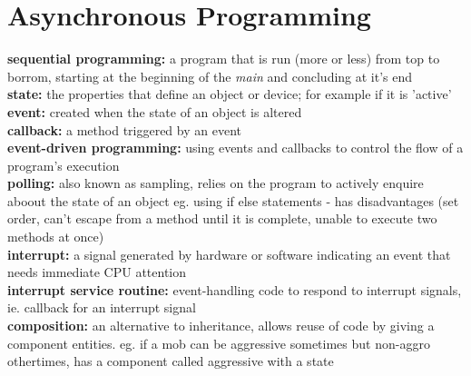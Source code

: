 \documentclass[a4paper,10pt]{article}
\begin{document}
\section {Asynchronous Programming}
\textcolor{RoyalPurple}{\textbf{sequential programming:}} a program that is run (more or less) from top to borrom, starting at the beginning of the \emph{main} and concluding at it's end \\ 
\textcolor{RoyalPurple}{\textbf{state:}} the properties that define an object or device; for example if it is 'active' \\ 
\textcolor{RoyalPurple}{\textbf{event:}} created when the state of an object is altered \\ 
\textcolor{RoyalPurple}{\textbf{callback:}} a method triggered by an event \\  
\textcolor{RoyalPurple}{\textbf{event-driven programming:}} using events and callbacks to control the flow of a program's execution \\ 	 
\textcolor{RoyalPurple}{\textbf{polling:}} also known as sampling, relies on the program to actively enquire aboout the state of an object eg. using if else statements - has disadvantages (set order, can't escape from a method until it is complete, unable to execute two methods at once)\\  
\textcolor{RoyalPurple}{\textbf{interrupt:}} a signal generated by hardware or software indicating an event that needs immediate CPU attention \\  
\textcolor{RoyalPurple}{\textbf{interrupt service routine:}} event-handling code to respond to interrupt signals, ie. callback for an interrupt signal \\  
\textcolor{RoyalPurple}{\textbf{composition:}} an alternative to inheritance, allows reuse of code by giving a component entities. eg. if a mob can be aggressive sometimes but non-aggro othertimes, has a component called aggressive with a state \\  
\end{document}
